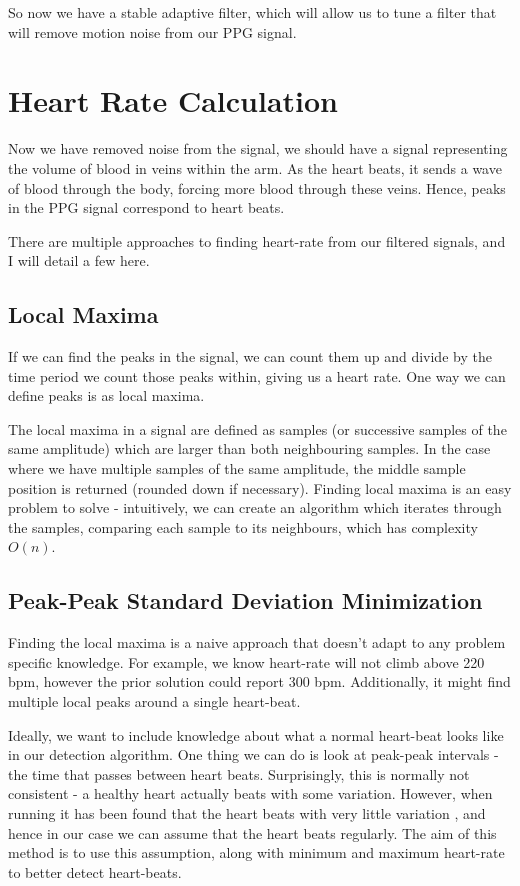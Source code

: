 \documentclass[12pt,a4paper,twoside,openany]{report}
\begin{document}
So now we have a stable adaptive filter, which will allow us to tune a filter
that will remove motion noise from our PPG signal.

\section{Heart Rate Calculation}

Now we have removed noise from the signal, we should have a signal 
representing the volume of blood in veins within the arm. As the heart beats,
it sends a wave of blood through the body, forcing more blood through these
veins. Hence, peaks in the PPG signal correspond to heart beats. 

There are multiple approaches to finding heart-rate from our filtered
signals, and I will detail a few here.

\subsection{Local Maxima}

If we can find the peaks in the signal, we can count them up and divide by the
time period we count those peaks within, giving us a heart rate. One way we
can define peaks is as local maxima.

The local maxima in a signal are defined as samples (or successive samples of
the same amplitude) which are larger than both
neighbouring samples. In the case where we have multiple samples of the same
amplitude, the middle
sample position is returned (rounded down if necessary).
Finding local maxima is an easy problem to solve - 
intuitively, we can create an algorithm which iterates through the samples,
comparing each sample to its neighbours, which has complexity \(O(n)\).

\subsection{Peak-Peak Standard Deviation Minimization}
\label{sec:sd-min}

Finding the local maxima is a naive approach that doesn't adapt to any problem
specific knowledge. For example, we know heart-rate will not climb above 220
bpm, however the prior solution could report 300 bpm. Additionally, it might
find multiple local peaks around a single heart-beat. 

Ideally, we want to include knowledge about what a normal heart-beat looks
like in our detection algorithm. One thing we can do is look at peak-peak
intervals - the time that passes between heart beats. Surprisingly, this is
normally not consistent - a healthy heart actually beats with some
variation. However, when running it has been found that the heart beats with
very little variation \cite{michael17}, and hence in our case we can assume that the heart
beats regularly. The aim of this method is to use this assumption, along with
minimum and maximum heart-rate to better detect heart-beats.
\end{document}
